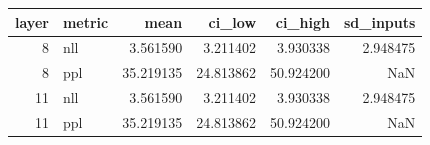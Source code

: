 \begin{tabular}{rlrrrr}
\toprule
layer & metric & mean & ci_low & ci_high & sd_inputs \\
\midrule
8 & nll & 3.561590 & 3.211402 & 3.930338 & 2.948475 \\
8 & ppl & 35.219135 & 24.813862 & 50.924200 & NaN \\
11 & nll & 3.561590 & 3.211402 & 3.930338 & 2.948475 \\
11 & ppl & 35.219135 & 24.813862 & 50.924200 & NaN \\
\bottomrule
\end{tabular}
